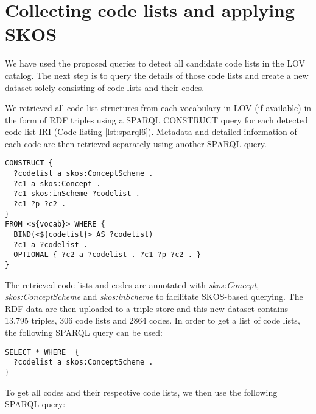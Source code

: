 \section{Collecting code lists and applying SKOS}
\label{s:skos_codelist_collecting}
We have used the proposed queries to detect all candidate code lists in the LOV catalog. The next step is to query the details of those code lists and create a new dataset solely consisting of code lists and their codes.

We retrieved all code list structures from each vocabulary in LOV (if available) in the form of RDF triples using a SPARQL CONSTRUCT query for each detected code list IRI (Code listing \ref{lst:sparql6}). Metadata and detailed information of each code are then retrieved separately using another SPARQL query.

\medskip
\medskip
\medskip

\begin{lstlisting}[captionpos=b, caption=Query to gather all code lists and annotate them with SKOS,label=lst:sparql6,basicstyle=\ttfamily,frame=single]
CONSTRUCT {
  ?codelist a skos:ConceptScheme .
  ?c1 a skos:Concept .
  ?c1 skos:inScheme ?codelist .
  ?c1 ?p ?c2 .
}
FROM <${vocab}> WHERE {
  BIND(<${codelist}> AS ?codelist)
  ?c1 a ?codelist .
  OPTIONAL { ?c2 a ?codelist . ?c1 ?p ?c2 . }
}
\end{lstlisting}

The retrieved code lists and codes are annotated with \textit{skos:Concept}, \textit{skos:ConceptScheme} and \textit{skos:inScheme} to facilitate SKOS-based querying. The RDF data are then uploaded to a triple store and this new dataset contains 13,795 triples, 306 code lists and 2864 codes. In order to get a list of code lists, the following SPARQL query can be used:

\begin{lstlisting}[captionpos=b, caption=Query to get a list of code lists,label=lst:sparql7,basicstyle=\ttfamily,frame=single]
SELECT * WHERE  {
  ?codelist a skos:ConceptScheme .
}
\end{lstlisting}

To get all codes and their respective code lists, we then use the following SPARQL query:

